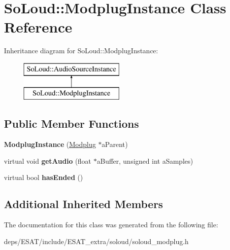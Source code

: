 \hypertarget{class_so_loud_1_1_modplug_instance}{}\section{So\+Loud\+:\+:Modplug\+Instance Class Reference}
\label{class_so_loud_1_1_modplug_instance}
Inheritance diagram for So\+Loud\+:\+:Modplug\+Instance\+:\begin{figure}[H]
\begin{center}
\leavevmode
\includegraphics[height=2.000000cm]{class_so_loud_1_1_modplug_instance}
\end{center}
\end{figure}
\subsection*{Public Member Functions}
\begin{DoxyCompactItemize}
\item 
\mbox{\label{class_so_loud_1_1_modplug_instance_a3f4cfdc6ca8cd7cd7bea503bf6acc4c6}} 
{\bfseries Modplug\+Instance} (\mbox{\hyperlink{class_so_loud_1_1_modplug}{Modplug}} $\ast$a\+Parent)
\item 
\mbox{\label{class_so_loud_1_1_modplug_instance_ab8deab09096e344e6876ec9e7b124a09}} 
virtual void {\bfseries get\+Audio} (float $\ast$a\+Buffer, unsigned int a\+Samples)
\item 
\mbox{\label{class_so_loud_1_1_modplug_instance_a8049bfb325ebaa57af8409413f2a79f5}} 
virtual bool {\bfseries has\+Ended} ()
\end{DoxyCompactItemize}
\subsection*{Additional Inherited Members}


The documentation for this class was generated from the following file\+:\begin{DoxyCompactItemize}
\item 
deps/\+E\+S\+A\+T/include/\+E\+S\+A\+T\+\_\+extra/soloud/soloud\+\_\+modplug.\+h\end{DoxyCompactItemize}
